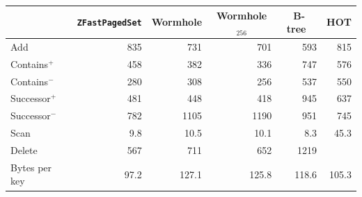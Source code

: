 \begin{tabular}{lrrrrr}
&\multicolumn{1}{c}{\texttt{ZFastPagedSet}}&\multicolumn{1}{c}{Wormhole}&\multicolumn{1}{c}{Wormhole$_{256}$}&\multicolumn{1}{c}{B-tree~\cite{Muller2025BTrees}}&\multicolumn{1}{c}{HOT}\\
\hline
Add & 835 & 731 & 701 & 593 & 815\\
Contains$^+$ & 458 & 382 & 336 & 747 & 576\\
Contains$^-$ & 280 & 308 & 256 & 537 & 550\\
Successor$^+$ & 481 & 448 & 418 & 945 & 637\\
Successor$^-$ & 782 & 1105 & 1190 & 951 & 745\\
Scan & 9.8 & 10.5 & 10.1 & 8.3 & 45.3\\
Delete & 567 & 711 & 652 & 1219 & \\
\hline
Bytes per key & 97.2 & 127.1 & 125.8 & 118.6 & 105.3\\
\end{tabular}
